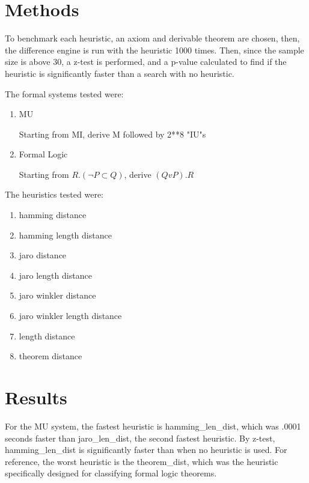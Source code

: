 \documentclass{article}
\begin{document}
\section{Methods}

To benchmark each heuristic, an axiom and derivable theorem are chosen, then, the difference engine is run with the heuristic 1000 times. 
Then, since the sample size is above 30, a z-test is performed, and a p-value calculated to find if the heuristic is significantly faster than a search with no heuristic.

The formal systems tested were:

\begin{enumerate}
    \item MU

        Starting from MI, derive M followed by 2**8 "IU"s
    \item Formal Logic

        Starting from $R.(\neg P \subset Q)$, derive $(QvP).R$
\end{enumerate}

The heuristics tested were:
\begin{enumerate}
    \item hamming distance
    \item hamming length distance
    \item jaro distance
    \item jaro length distance
    \item jaro winkler distance
    \item jaro winkler length distance
    \item length distance
    \item theorem distance
\end{enumerate}

\section{Results}

For the MU system, the fastest heuristic is hamming\_len\_dist, which was .0001 seconds faster than jaro\_len\_dist, the second fastest heuristic.
By z-test, hamming\_len\_dist is significantly faster than when no heuristic is used. 
For reference, the worst heuristic is the theorem\_dist, which was the heuristic specifically designed for classifying formal logic theorems.
\end{document}
